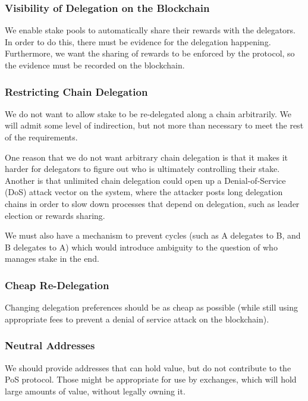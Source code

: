 \documentclass[11pt,a4paper]{article}
\begin{document}
\subsubsection{Visibility of Delegation on the Blockchain}
\label{visibility-of-delegation-on-the-blockchain}

We enable stake pools to automatically share their rewards with the
delegators. In order to do this, there must be evidence for the
delegation happening. Furthermore, we want the sharing of rewards to be
enforced by the protocol, so the evidence must be recorded on the
blockchain.

\subsubsection{Restricting Chain Delegation}
\label{restricting-chain-delegation}

We do not want to allow stake to be re-delegated along a chain
arbitrarily. We will admit some level of indirection, but not more than
necessary to meet the rest of the requirements.

One reason that we do not want arbitrary chain delegation is that it
makes it harder for delegators to figure out who is ultimately
controlling their stake. Another is that unlimited chain delegation
could open up a Denial-of-Service (DoS) attack vector on the system,
where the attacker posts long delegation chains in order to slow down
processes that depend on delegation, such as leader election or rewards
sharing.

We must also have a mechanism to prevent cycles (such as A delegates to
B, and B delegates to A) which would introduce ambiguity to the question
of who manages stake in the end.

\subsubsection{Cheap Re-Delegation}
\label{cheap-re-delegation}

Changing delegation preferences should be as cheap as possible (while
still using appropriate fees to prevent a denial of service attack on
the blockchain).

\subsubsection{Neutral Addresses}
\label{neutral-addresses}

We should provide addresses that can hold value, but do not contribute
to the PoS protocol. Those might be appropriate for use by exchanges,
which will hold large amounts of value, without legally owning it.
\end{document}
